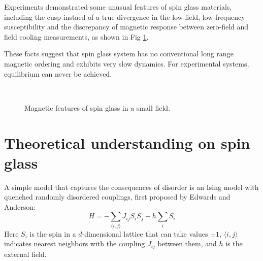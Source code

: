 Experiments demonstrated some unusual features of spin glass materials, 
including the cusp instaed of a true divergence in the low-field, low-frequency 
susceptibility and the discrepancy of magnetic response between zero-field and field cooling 
measurements, as shown in Fig \ref{fig:experimentsSG}. 

These facts suggest that spin glass system has no conventional 
long range magnetic ordering and exhibits very slow dynamics. For experimental systems, 
equilibrium can  never be achieved. 

\begin{figure}[!h]
  \label{fig:experimentsSG}
  \centering
  \\  
  \caption{Magnetic features of spin glass in a small field.}
\end{figure}

\section{Theoretical understanding on spin glass}
A simple model that captures the consequences of disorder is an Ising model 
with quenched randomly disordered couplings, first proposed by Edwards and 
Anderson:
\begin{equation}
  \label{eq:EA}
  H=-\sum_{\langle i,j \rangle}J_{ij}S_iS_j-h\sum_iS_i
\end{equation}
Here $S_i$ is the spin in a $d$-dimensional lattice that can take values $\pm 1$,
$\langle i,j \rangle$ indicates nearest neighbors with the coupling $J_{ij}$ between 
them, and $h$ is the external field.
 
